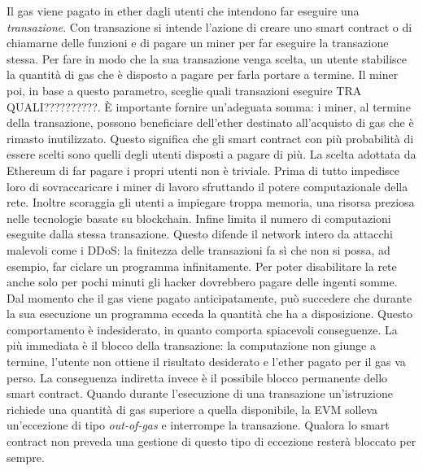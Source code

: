 Il gas viene pagato in ether dagli utenti che intendono far eseguire una \textit{transazione}. Con transazione si intende l'azione di creare uno smart contract o di chiamarne delle funzioni e di pagare un miner per far eseguire la transazione stessa.\newline
Per fare in modo che la sua transazione venga scelta, un utente stabilisce la quantità di gas che è disposto a pagare per farla portare a termine. Il miner poi, in base a questo parametro, sceglie quali transazioni eseguire TRA QUALI??????????. \`E importante fornire un'adeguata somma: i miner, al termine della transazione, possono beneficiare dell'ether destinato all'acquisto di gas che è rimasto inutilizzato. Questo significa che gli smart contract con più probabilità di essere scelti sono quelli degli utenti disposti a pagare di più.\newline
La scelta adottata da Ethereum di far pagare i propri utenti non è triviale. Prima di tutto impedisce loro di sovraccaricare i miner di lavoro sfruttando il potere computazionale della rete. Inoltre scoraggia gli utenti a impiegare troppa memoria, una risorsa preziosa nelle tecnologie basate su blockchain. Infine limita il numero di computazioni eseguite dalla stessa transazione. Questo difende il network intero da attacchi malevoli come i DDoS: la finitezza delle transazioni fa sì che non si possa, ad esempio, far ciclare un programma infinitamente. Per poter disabilitare la rete anche solo per pochi minuti gli hacker dovrebbero pagare delle ingenti somme.\newline
Dal momento che il gas viene pagato anticipatamente, può succedere che durante la sua esecuzione un programma ecceda la quantità che ha a disposizione. Questo comportamento è  indesiderato, in quanto comporta spiacevoli conseguenze. La più immediata è il blocco della transazione: la computazione non giunge a termine, l'utente non ottiene il risultato desiderato e l'ether pagato per il gas va perso.\newline 
La conseguenza indiretta invece è il possibile blocco permanente dello smart contract. Quando durante l'esecuzione di una transazione un'istruzione richiede una quantità di gas superiore a quella disponibile, la EVM solleva un'eccezione di tipo \textit{out-of-gas} e interrompe la transazione. Qualora lo smart contract non preveda una gestione di questo tipo di eccezione resterà bloccato per sempre.\newline



